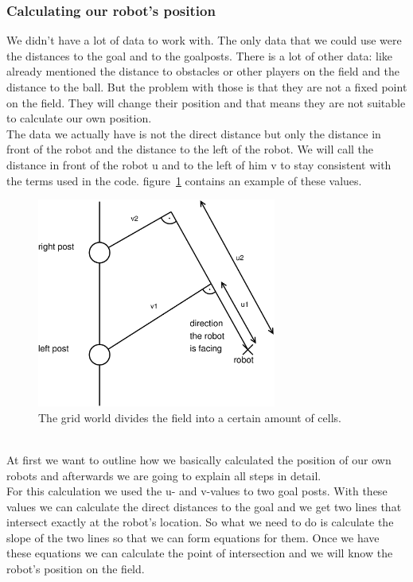 \documentclass[lnicst,a4paper]{svmultln}
\begin{document}
\subsubsection{Calculating our robot's position}
We didn't have a lot of data to work with. The only data that we could use were the distances to the goal and to the goalposts. There is a lot of other data: like already mentioned the distance to obstacles or other players on the field and the distance to the ball. But the problem with those is that they are not a fixed point on the field. They will change their position and that means they are not suitable to calculate our own position. 
\\
The data we actually have is not the direct distance but only the distance in front of the robot and the distance to the left of the robot. We will call the distance in front of the robot u and to the left of him v to stay consistent with the terms used in the code. figure~\ref{fig:uvvalues} contains an example of these values.
\begin{figure}
 	\centerline{\includegraphics[width=0.7\textwidth]{uvvalues.pdf}}
	{\caption{The grid world divides the field into a certain amount of cells.}\label{fig:uvvalues}}
\end{figure}
\\
At first we want to outline how we basically calculated the position of our own robots and afterwards we are going to explain all steps in detail.\\
For this calculation we used the u- and v-values to two goal posts. With these values we can calculate the direct distances to the goal and we get two lines that intersect exactly at the robot's location. So what we need to do is calculate the slope of the two lines so that we can form equations for them. Once we have these equations we can calculate the point of intersection and we will know the robot's position on the field.
\end{document}
